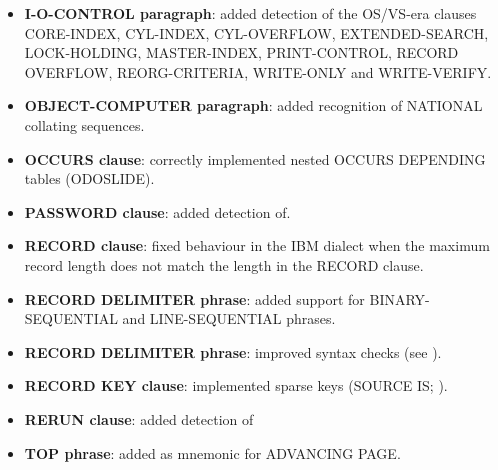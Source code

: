\begin{itemize}
\item \textbf{I-O-CONTROL paragraph}: added detection of the OS/VS-era clauses CORE-INDEX, CYL-INDEX, CYL-OVERFLOW, EXTENDED-SEARCH, LOCK-HOLDING, MASTER-INDEX, PRINT-CONTROL, RECORD OVERFLOW, REORG-CRITERIA, WRITE-ONLY and WRITE-VERIFY.
\item \textbf{OBJECT-COMPUTER paragraph}: added recognition of NATIONAL collating sequences.
\item \textbf{OCCURS clause}: correctly implemented nested OCCURS DEPENDING tables (ODOSLIDE).
\item \textbf{PASSWORD clause}: added detection of.
\item \textbf{RECORD clause}: fixed behaviour in the IBM dialect when the maximum record length does not match the length in the RECORD clause.
\item \textbf{RECORD DELIMITER phrase}:  added support for BINARY-SEQUENTIAL and LINE-SEQUENTIAL phrases.
\item \textbf{RECORD DELIMITER phrase}: improved syntax checks (see ).
\item \textbf{RECORD KEY clause}: implemented sparse keys (SOURCE IS; ).
\item \textbf{RERUN clause}: added detection of
\item \textbf{TOP phrase}: added as mnemonic for ADVANCING PAGE.
\end{itemize}

